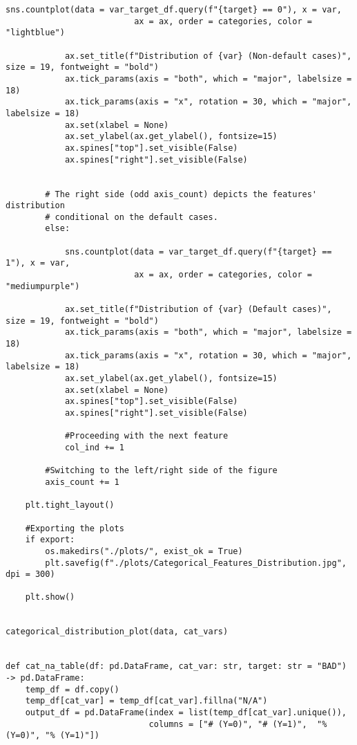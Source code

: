 \begin{lstlisting}[basicstyle=\footnotesize\ttfamily]
            sns.countplot(data = var_target_df.query(f"{target} == 0"), x = var,
                          ax = ax, order = categories, color = "lightblue")

            ax.set_title(f"Distribution of {var} (Non-default cases)", size = 19, fontweight = "bold")
            ax.tick_params(axis = "both", which = "major", labelsize = 18)
            ax.tick_params(axis = "x", rotation = 30, which = "major", labelsize = 18)
            ax.set(xlabel = None)
            ax.set_ylabel(ax.get_ylabel(), fontsize=15)
            ax.spines["top"].set_visible(False)
            ax.spines["right"].set_visible(False)
                        
        
        # The right side (odd axis_count) depicts the features' distribution
        # conditional on the default cases.
        else:
            
            sns.countplot(data = var_target_df.query(f"{target} == 1"), x = var,
                          ax = ax, order = categories, color = "mediumpurple")

            ax.set_title(f"Distribution of {var} (Default cases)", size = 19, fontweight = "bold")
            ax.tick_params(axis = "both", which = "major", labelsize = 18)
            ax.tick_params(axis = "x", rotation = 30, which = "major", labelsize = 18)
            ax.set_ylabel(ax.get_ylabel(), fontsize=15)
            ax.set(xlabel = None)
            ax.spines["top"].set_visible(False)
            ax.spines["right"].set_visible(False)

            #Proceeding with the next feature
            col_ind += 1

        #Switching to the left/right side of the figure
        axis_count += 1

    plt.tight_layout()

    #Exporting the plots
    if export:
        os.makedirs("./plots/", exist_ok = True)
        plt.savefig(f"./plots/Categorical_Features_Distribution.jpg", dpi = 300)
        
    plt.show()


categorical_distribution_plot(data, cat_vars)


def cat_na_table(df: pd.DataFrame, cat_var: str, target: str = "BAD") -> pd.DataFrame:
    temp_df = df.copy()
    temp_df[cat_var] = temp_df[cat_var].fillna("N/A") 
    output_df = pd.DataFrame(index = list(temp_df[cat_var].unique()),
                             columns = ["# (Y=0)", "# (Y=1)",  "% (Y=0)", "% (Y=1)"])


\end{lstlisting}

